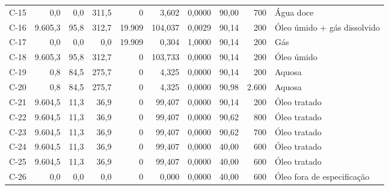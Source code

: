 \documentclass[11pt,a4paper]{article}
\numberwithin{equation}{section}
\numberwithin{table}{section}
\numberwithin{figure}{section}
\begin{document}
{\begin{longtable}{lrrrrrrrrL{2.5cm}}
C-15 & 0,0 & 0,0 & 311,5 & 0 & 3,602 & 0,0000 & 90,00 & 700 & {\scriptsize Água doce}\\
C-16 & 9.605,3 & 95,8 & 312,7 & 19.909 & 104,037 & 0,0029 & 90,14 & 200 & {\scriptsize Óleo úmido + gás dissolvido}\\
C-17 & 0,0 & 0,0 & 0,0 & 19.909 & 0,304 & 1,0000 & 90,14 & 200 & {\scriptsize Gás}\\
C-18 & 9.605,3 & 95,8 & 312,7 & 0 & 103,733 & 0,0000 & 90,14 & 200 & {\scriptsize Óleo úmido}\\
C-19 & 0,8 & 84,5 & 275,7 & 0 & 4,325 & 0,0000 & 90,14 & 200 & {\scriptsize Aquosa}\\
C-20 & 0,8 & 84,5 & 275,7 & 0 & 4,325 & 0,0000 & 90,98 & 2.600 & {\scriptsize Aquosa}\\
C-21 & 9.604,5 & 11,3 & 36,9 & 0 & 99,407 & 0,0000 & 90,14 & 200 & {\scriptsize Óleo tratado}\\
C-22 & 9.604,5 & 11,3 & 36,9 & 0 & 99,407 & 0,0000 & 90,62 & 800 & {\scriptsize Óleo tratado}\\
C-23 & 9.604,5 & 11,3 & 36,9 & 0 & 99,407 & 0,0000 & 90,62 & 700 & {\scriptsize Óleo tratado}\\
C-24 & 9.604,5 & 11,3 & 36,9 & 0 & 99,407 & 0,0000 & 40,00 & 600 & {\scriptsize Óleo tratado}\\
C-25 & 9.604,5 & 11,3 & 36,9 & 0 & 99,407 & 0,0000 & 40,00 & 600 & {\scriptsize Óleo tratado}\\
C-26 & 0,0 & 0,0 & 0,0 & 0 & 0,000 & 0,0000 & 40,00 & 600 & {\scriptsize Óleo fora de especificação}\\
\bottomrule\end{longtable}}
\end{document}
